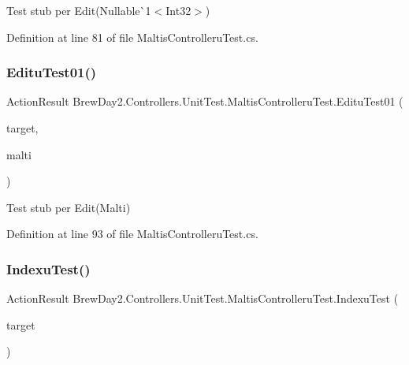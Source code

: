 Test stub per Edit(Nullable\`{}1$<$Int32$>$)



Definition at line 81 of file Maltis\+Controlleru\+Test.\+cs.

\mbox{\label{class_brew_day2_1_1_controllers_1_1_unit_test_1_1_maltis_controlleru_test_a44d1a614c361f6aa994de4b03206293f}} 
\subsubsection{\texorpdfstring{Editu\+Test01()}{EdituTest01()}}
{\footnotesize\ttfamily Action\+Result Brew\+Day2.\+Controllers.\+Unit\+Test.\+Maltis\+Controlleru\+Test.\+Editu\+Test01 (\begin{DoxyParamCaption}\item[{\mbox{[}\+Pex\+Assume\+Under\+Test\mbox{]} \mbox{\hyperlink{class_brew_day2_1_1_controllers_1_1_maltis_controller}{Maltis\+Controller}}}]{target,  }\item[{\mbox{\hyperlink{class_brew_day2_1_1_models_1_1_malti}{Malti}}}]{malti }\end{DoxyParamCaption})}



Test stub per Edit(\+Malti)



Definition at line 93 of file Maltis\+Controlleru\+Test.\+cs.

\mbox{\label{class_brew_day2_1_1_controllers_1_1_unit_test_1_1_maltis_controlleru_test_a85b0bf25ad9e49d0d28defa68cbd564a}} 
\subsubsection{\texorpdfstring{Indexu\+Test()}{IndexuTest()}}
{\footnotesize\ttfamily Action\+Result Brew\+Day2.\+Controllers.\+Unit\+Test.\+Maltis\+Controlleru\+Test.\+Indexu\+Test (\begin{DoxyParamCaption}\item[{\mbox{[}\+Pex\+Assume\+Under\+Test\mbox{]} \mbox{\hyperlink{class_brew_day2_1_1_controllers_1_1_maltis_controller}{Maltis\+Controller}}}]{target }\end{DoxyParamCaption})}



